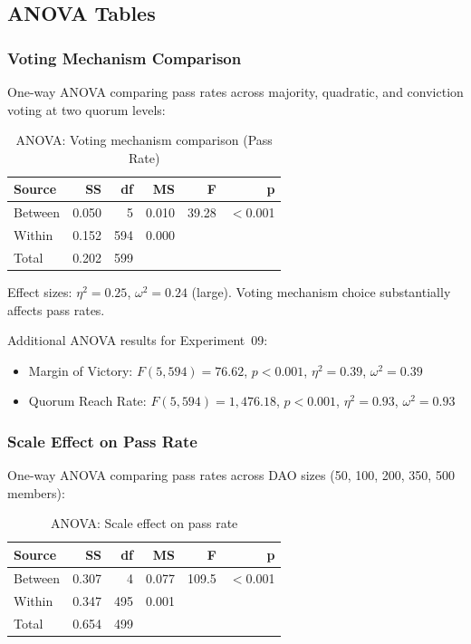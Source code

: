 \subsection{ANOVA Tables}

\subsubsection{Voting Mechanism Comparison}

One-way ANOVA comparing pass rates across majority, quadratic, and conviction voting at two quorum levels:

\begin{table}[htbp]
\centering
\caption{ANOVA: Voting mechanism comparison (Pass Rate)}
\label{tab:anova-voting}
\begin{tabular}{lrrrrr}
\toprule
Source & SS & df & MS & F & p \\
\midrule
Between & 0.050 & 5 & 0.010 & 39.28 & $<$0.001 \\
Within & 0.152 & 594 & 0.000 & & \\
Total & 0.202 & 599 & & & \\
\bottomrule
\end{tabular}
\end{table}

Effect sizes: $\eta^2 = 0.25$, $\omega^2 = 0.24$ (large). Voting mechanism choice substantially affects pass rates.

Additional ANOVA results for Experiment~09:
\begin{itemize}
    \item Margin of Victory: $F(5,594) = 76.62$, $p < 0.001$, $\eta^2 = 0.39$, $\omega^2 = 0.39$
    \item Quorum Reach Rate: $F(5,594) = 1{,}476.18$, $p < 0.001$, $\eta^2 = 0.93$, $\omega^2 = 0.93$
\end{itemize}

\subsubsection{Scale Effect on Pass Rate}

One-way ANOVA comparing pass rates across DAO sizes (50, 100, 200, 350, 500 members):

\begin{table}[htbp]
\centering
\caption{ANOVA: Scale effect on pass rate}
\label{tab:anova-scale}
\begin{tabular}{lrrrrr}
\toprule
Source & SS & df & MS & F & p \\
\midrule
Between & 0.307 & 4 & 0.077 & 109.5 & $<$0.001 \\
Within & 0.347 & 495 & 0.001 & & \\
Total & 0.654 & 499 & & & \\
\bottomrule
\end{tabular}
\end{table}

